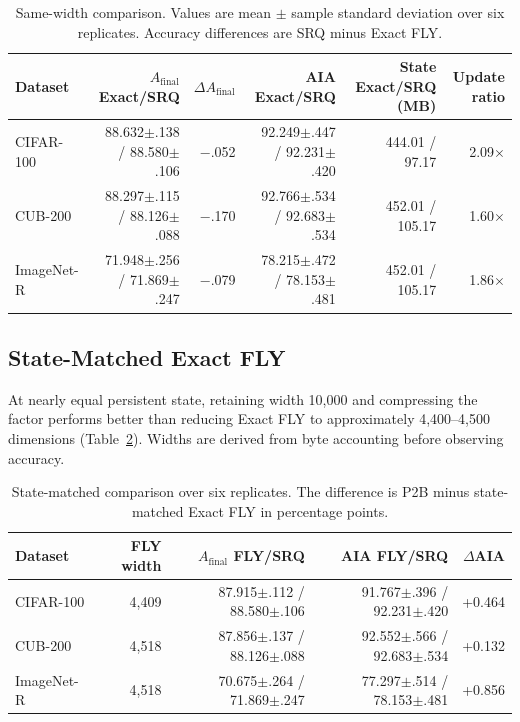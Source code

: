 \documentclass[runningheads]{llncs}
\begin{document}
\begin{table}
\caption{Same-width comparison. Values are mean $\pm$ sample standard
deviation over six replicates. Accuracy differences are SRQ minus Exact FLY.}
\label{tab:same-width}
\centering
\small
\begin{tabular}{lrrrrr}
\toprule
Dataset & $A_{\mathrm{final}}$ Exact/SRQ & $\Delta A_{\mathrm{final}}$ &
AIA Exact/SRQ & State Exact/SRQ (MB) & Update ratio \\
\midrule
CIFAR-100 & 88.632$\pm$.138 / 88.580$\pm$.106 & $-$.052 &
92.249$\pm$.447 / 92.231$\pm$.420 & 444.01 / 97.17 & 2.09$\times$ \\
CUB-200 & 88.297$\pm$.115 / 88.126$\pm$.088 & $-$.170 &
92.766$\pm$.534 / 92.683$\pm$.534 & 452.01 / 105.17 & 1.60$\times$ \\
ImageNet-R & 71.948$\pm$.256 / 71.869$\pm$.247 & $-$.079 &
78.215$\pm$.472 / 78.153$\pm$.481 & 452.01 / 105.17 & 1.86$\times$ \\
\bottomrule
\end{tabular}
\end{table}

\subsection{State-Matched Exact FLY}

At nearly equal persistent state, retaining width 10,000 and compressing the
factor performs better than reducing Exact FLY to approximately 4,400--4,500
dimensions (Table~\ref{tab:state-matched}). Widths are derived from byte
accounting before observing accuracy.

\begin{table}
\caption{State-matched comparison over six replicates. The difference is P2B
minus state-matched Exact FLY in percentage points.}
\label{tab:state-matched}
\centering
\small
\begin{tabular}{lrrrr}
\toprule
Dataset & FLY width & $A_{\mathrm{final}}$ FLY/SRQ & AIA FLY/SRQ &
$\Delta$AIA \\
\midrule
CIFAR-100 & 4,409 & 87.915$\pm$.112 / 88.580$\pm$.106 &
91.767$\pm$.396 / 92.231$\pm$.420 & +0.464 \\
CUB-200 & 4,518 & 87.856$\pm$.137 / 88.126$\pm$.088 &
92.552$\pm$.566 / 92.683$\pm$.534 & +0.132 \\
ImageNet-R & 4,518 & 70.675$\pm$.264 / 71.869$\pm$.247 &
77.297$\pm$.514 / 78.153$\pm$.481 & +0.856 \\
\bottomrule
\end{tabular}
\end{table}
\end{document}
